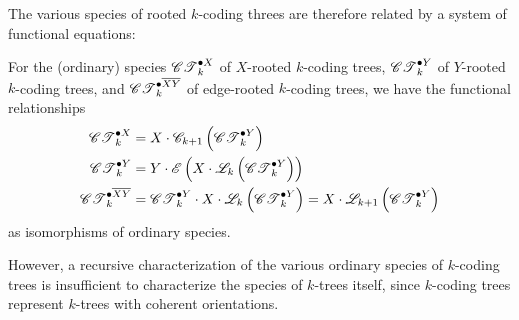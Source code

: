 \documentclass[sectionflow,singlespace,twoside,boldmathhdr,draft]{brandiss} %
\numberwithin{section}{chapter}
\numberwithin{figure}{chapter}
\begin{document}
The various species of rooted $k$-coding threes are therefore related by a system of functional equations:
\begin{observation}
  \label{obs:funcdecompct}
  For the (ordinary) species $\pointed[X]{\specname{CT}}_{k}$ of $X$-rooted $k$-coding trees, $\pointed[Y]{\specname{CT}}_{k}$ of $Y$-rooted $k$-coding trees, and $\pointed[\overline{XY}]{\specname{CT}}_{k}$ of edge-rooted $k$-coding trees, we have the functional relationships
  \begin{subequations}
    \label{eq:ctfunc}
    \begin{align}
      \pointed[X]{\specname{CT}}_{k} &= X \cdot \specname{C}_{k+1} \pbrac{\pointed[Y]{\specname{CT}}_{k}} \label{eq:ctxfunc} \\
      \pointed[Y]{\specname{CT}}_{k} &= Y \cdot \specname{E} \pbrac{X \cdot \specname{L}_{k} \pbrac{\pointed[Y]{\specname{CT}}_{k}}} \label{eq:ctyfunc} \\
      \pointed[\overline{XY}]{\specname{CT}}_{k} &= \pointed[Y]{\specname{CT}}_{k} \cdot X \cdot \specname{L}_{k} \pbrac{\pointed[Y]{\specname{CT}}_{k}} = X \cdot \specname{L}_{k+1} \pbrac{\pointed[Y]{\specname{CT}}_{k}} \label{eq:ctxyfunc}
    \end{align}
  \end{subequations}
  as isomorphisms of ordinary species.
\end{observation}

However, a recursive characterization of the various ordinary species of $k$-coding trees is insufficient to characterize the species of $k$-trees itself, since $k$-coding trees represent $k$-trees with coherent orientations.
\end{document}
